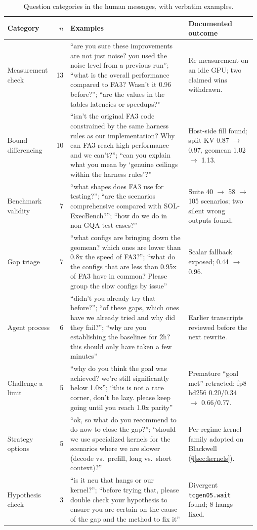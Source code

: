 \begin{table}[t]
\centering\small
\caption{Question categories in the human messages, with verbatim examples.}
\label{tab:qbank-human}
\setlength{\tabcolsep}{4pt}\footnotesize
\begin{tabular}{@{}p{}rp{}p{}@{}}
\toprule
Category & $n$ & Examples & Documented outcome \\
\midrule
Measurement check & 13 &
``are you sure these improvements are not just noise? you used the noise level from a previous run''; ``what is the overall performance compared to FA3? Wasn't it 0.96 before?''; ``are the values in the tables latencies or speedups?'' &
Re-measurement on an idle GPU; two claimed wins withdrawn. \\
\addlinespace
Bound differencing & 10 &
``isn't the original FA3 code constrained by the same harness rules as our implementation? Why can FA3 reach high performance and we can't?''; ``can you explain what you mean by `genuine ceilings within the harness rules'?'' &
Host-side fill found; split-KV 0.87 $\to$ 0.97, geomean 1.02 $\to$ 1.13. \\
\addlinespace
Benchmark validity & 7 &
``what shapes does FA3 use for testing?''; ``are the scenarios comprehensive compared with SOL-ExecBench?''; ``how do we do in non-GQA test cases?'' &
Suite 40 $\to$ 58 $\to$ 105 scenarios; two silent wrong outputs found. \\
\addlinespace
Gap triage & 7 &
``what configs are bringing down the geomean? which ones are lower than 0.8x the speed of FA3?''; ``what do the configs that are less than 0.95x of FA3 have in common? Please group the slow configs by issue'' &
Scalar fallback exposed; 0.44 $\to$ 0.96. \\
\addlinespace
Agent process & 6 &
``didn't you already try that before?''; ``of these gaps, which ones have we already tried and why did they fail?''; ``why are you establishing the baselines for 2h? this should only have taken a few minutes'' &
Earlier transcripts reviewed before the next rewrite. \\
\addlinespace
Challenge a limit & 5 &
``why do you think the goal was achieved? we're still significantly below 1.0x''; ``this is not a rare corner, don't be lazy. please keep going until you reach 1.0x parity'' &
Premature ``goal met'' retracted; fp8 hd256 0.20/0.34 $\to$ 0.66/0.77. \\
\addlinespace
Strategy options & 5 &
``ok, so what do you recommend to do now to close the gap?''; ``should we use specialized kernels for the scenarios where we are slower (decode vs.\ prefill, long vs.\ short context)?'' &
Per-regime kernel family adopted on Blackwell (\S\ref{sec:kernels}). \\
\addlinespace
Hypothesis check & 3 &
``is it ncu that hangs or our kernel?''; ``before trying that, please double check your hypothesis to ensure you are certain on the cause of the gap and the method to fix it'' &
Divergent \texttt{tcgen05.wait} found; 8 hangs fixed. \\
\bottomrule
\end{tabular}
\end{table}

